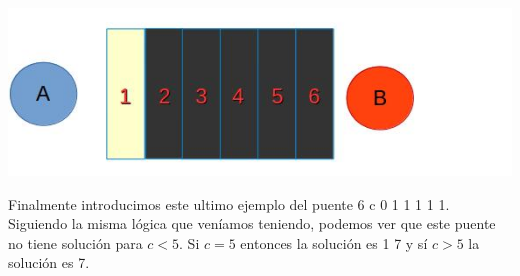 \documentclass{article}
\begin{document}
\vspace{1cm}
\includegraphics[width=\textwidth,height=\textheight,keepaspectratio
]{ejemplopuentes3.jpg}
\begin {flushleft}
Finalmente introducimos este ultimo ejemplo del puente 6 c 0 1 1 1 1 1.
Siguiendo la misma l\'ogica que ven\'iamos teniendo, podemos ver que este puente no tiene soluci\'on para \textit{$c < 5$}. Si \textit{$c = 5$} entonces la soluci\'on es 1 7 y s\'i \textit{$c > 5$} la soluci\'on es 7.
\end{flushleft}
\end{document}
